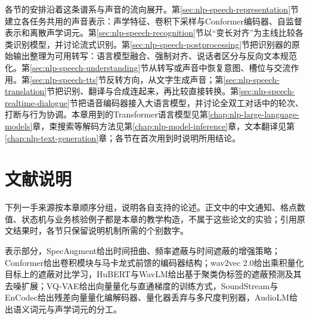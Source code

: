各节的安排沿着这条谱系与声音的流向展开。第\ref{sec:nlp-speech-representation}节建立各任务共用的声音表示：声学特征、卷积下采样与Conformer编码器、自监督表示和离散声学词元。第\ref{sec:nlp-speech-recognition}节以“变长对齐”为主线比较各类识别模型，并讨论流式识别。第\ref{sec:nlp-speech-postprocessing}节把识别器的原始输出整理为可用转写：语言模型融合、强制对齐、说话者区分与反向文本规范化。第\ref{sec:nlp-speech-understanding}节从转写或声音中恢复意图、槽位与交流作用。第\ref{sec:nlp-speech-tts}节反转方向，从文字生成声音；第\ref{sec:nlp-speech-translation}节把识别、翻译与合成连起来，再比较直接转换。第\ref{sec:nlp-speech-realtime-dialogue}节把语音编码器接入大语言模型，并讨论全双工对话中的轮次、打断与行为协调。本章用到的Transformer语言模型见第\ref{chap:nlp-large-language-models}章，束搜索等解码方法见第\ref{chap:nlp-model-inference}章，文本翻译见第\ref{chap:nlp-text-generation}章；各节在首次用到时说明所用结论。









\section*{文献说明}
\label{sec:nlp-speech-literature}

下列一手来源按本章顺序分组，说明各自支持的论述。正文中的中文通知、格点数值、状态机与业务核验例子都是本章的教学构造，不属于这些论文的实验；引用原文结果时，各节只保留说明机制所需的个别数字。

表示部分，SpecAugment给出时间扭曲、频率遮蔽与时间遮蔽的增强策略\cite{nlp-speech-park2019}；Conformer给出卷积模块与马卡龙式前馈的编码器结构\cite{nlp-speech-gulati2020conformer}；wav2vec 2.0给出乘积量化目标上的遮蔽对比学习\cite{nlp-speech-baevski2020wav2vec2}，HuBERT与WavLM给出基于聚类伪标签的遮蔽预测及其去噪扩展\cite{nlp-speech-hsu2021hubert,nlp-speech-chen2022wavlm}；VQ-VAE给出向量量化与直通梯度的训练方式\cite{nlp-speech-oord2017vqvae}，SoundStream与EnCodec给出残差向量量化编解码器、量化器丢弃与多尺度判别器\cite{nlp-speech-zeghidour2022soundstream,nlp-speech-defossez2023encodec}，AudioLM给出语义词元与声学词元的分工\cite{nlp-speech-borsos2023audiolm}。

